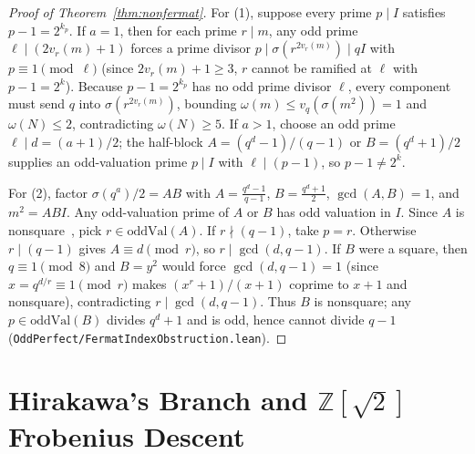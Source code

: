 \documentclass[11pt]{amsart}
\theoremstyle{definition}
\theoremstyle{remark}
\begin{document}
\begin{proof}[Proof of Theorem~\ref{thm:nonfermat}]
For (1), suppose every prime $p \mid I$ satisfies $p - 1 = 2^{k_p}$. If $a = 1$, then for each prime $r \mid m$, any odd prime $\ell \mid (2 v_r(m) + 1)$ forces a prime divisor $p \mid \sigma(r^{2 v_r(m)}) \mid q I$ with $p \equiv 1 \pmod \ell$ (since $2 v_r(m) + 1 \ge 3$, $r$ cannot be ramified at $\ell$ with $p - 1 = 2^k$). Because $p - 1 = 2^{k_p}$ has no odd prime divisor $\ell$, every component must send $q$ into $\sigma(r^{2 v_r(m)})$, bounding $\omega(m) \le v_q(\sigma(m^2)) = 1$ and $\omega(N) \le 2$, contradicting $\omega(N) \ge 5$. If $a > 1$, choose an odd prime $\ell \mid d = (a + 1)/2$; the half-block $A = (q^d - 1)/(q - 1)$ or $B = (q^d + 1)/2$ supplies an odd-valuation prime $p \mid I$ with $\ell \mid (p - 1)$, so $p - 1 \ne 2^k$.

For (2), factor $\sigma(q^a)/2 = A B$ with $A = \frac{q^d - 1}{q - 1}$, $B = \frac{q^d + 1}{2}$, $\gcd(A, B) = 1$, and $m^2 = A B I$. Any odd-valuation prime of $A$ or $B$ has odd valuation in $I$. Since $A$ is nonsquare~\cite{Ljunggren1943}, pick $r \in \mathrm{oddVal}(A)$. If $r \nmid (q - 1)$, take $p = r$. Otherwise $r \mid (q - 1)$ gives $A \equiv d \pmod r$, so $r \mid \gcd(d, q - 1)$. If $B$ were a square, then $q \equiv 1 \pmod 8$ and $B = y^2$ would force $\gcd(d, q - 1) = 1$ (since $x = q^{d/r} \equiv 1 \pmod r$ makes $(x^r + 1)/(x + 1)$ coprime to $x + 1$ and nonsquare), contradicting $r \mid \gcd(d, q - 1)$. Thus $B$ is nonsquare; any $p \in \mathrm{oddVal}(B)$ divides $q^d + 1$ and is odd, hence cannot divide $q - 1$ (\texttt{OddPerfect/FermatIndexObstruction.lean}).
\end{proof}

\section{Hirakawa's Branch and $\mathbb{Z}[\sqrt{2}]$ Frobenius Descent}
\end{document}
